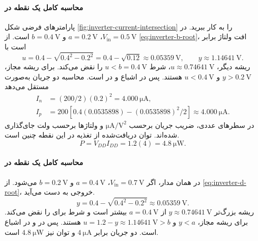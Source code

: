 \paragraph*{محاسبه کامل یک نقطه در }
پارامترهای فرضی شکل \ref{fig:inverter-current-intersection} را
به کار ببرید. در \(V_{\mathrm{in}}=\qty{0.5}{\volt}\)،
\(a=\qty{0.2}{\volt}\) و \(b=\qty{0.4}{\volt}\) است.
از \eqref{eq:inverter-b-root}، افت ولتاژ  برابر است با
\begin{equation*}
 u=0.4-\sqrt{0.4^2-0.2^2}
   =0.4-\sqrt{0.12}\approx\qty{0.05359}{\volt},\qquad
 y\approx\qty{1.14641}{\volt}.
\end{equation*}
ریشه دیگر، \(u\approx\qty{0.74641}{\volt}\)، شرط
\(u<b=\qty{0.4}{\volt}\) را نقض می‌کند. برای ریشه مجاز،
\(y>\qty{0.2}{\volt}\) و \(u<\qty{0.4}{\volt}\) هستند.
پس  در اشباع و  در  است.
محاسبه دو جریان به‌صورت مستقل می‌دهد
\begin{align*}
 I_n&=(200/2)(0.2)^2=\qty{4.000}{\micro\ampere},\\
 I_p&=200[0.4(0.0535898)-(0.0535898)^2/2]
       \approx\qty{4.000}{\micro\ampere}.
\end{align*}
در سطرهای عددی، ضریب جریان برحسب
\(\unit{\micro\ampere\per\volt\squared}\) و ولتاژها برحسب ولت
جای‌گذاری شده‌اند. توان دریافت‌شده از تغذیه در این نقطه چنین است.
\[
 P=V_{DD}I_{DD}=1.2(4)=\qty{4.8}{\micro\watt}.
\]

\paragraph*{محاسبه کامل یک نقطه در }
در همان مدار، اگر \(V_{\mathrm{in}}=\qty{0.7}{\volt}\)،
\(a=\qty{0.4}{\volt}\) و \(b=\qty{0.2}{\volt}\) می‌شود.
از \eqref{eq:inverter-d-root}، خروجی به دست می‌آید.
\[
 y=0.4-\sqrt{0.4^2-0.2^2}\approx\qty{0.05359}{\volt}.
\]
ریشه بزرگ‌تر \(y\approx\qty{0.74641}{\volt}\) از
\(a=\qty{0.4}{\volt}\) بیشتر است و شرط 
برای  را نقض می‌کند. برای ریشه مجاز،
\(y<a\) و \(u=1.2-y\approx\qty{1.14641}{\volt}>b\) هستند.
پس  در  و  در اشباع است.
دو جریان برابر \(\qty{4}{\micro\ampere}\) و توان نیز
\(\qty{4.8}{\micro\watt}\) است.

